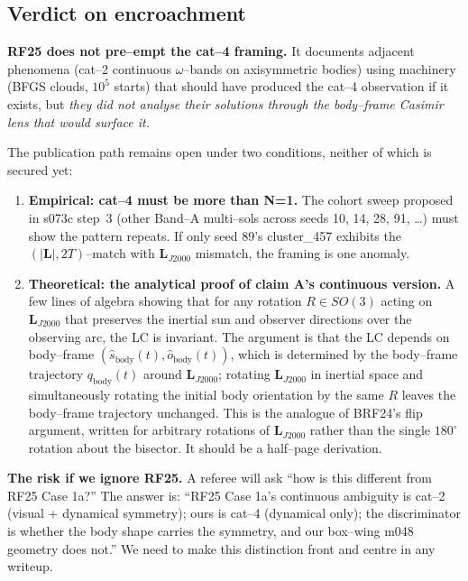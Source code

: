 \documentclass[11pt]{article}
\newcommand{\Lvec}{\mathbf{L}}
\newcommand{\LJ}{\Lvec_{J2000}}
\begin{document}
\subsection{Verdict on encroachment}

\noindent
\textbf{RF25 does not pre--empt the cat--4 framing.} It documents adjacent
phenomena (cat--2 continuous $\omega$--bands on axisymmetric bodies) using
machinery (BFGS clouds, $10^5$ starts) that should have produced the cat--4
observation if it exists, but \emph{they did not analyse their solutions
through the body--frame Casimir lens that would surface it.}

The publication path remains open under two conditions, neither of which is
secured yet:

\begin{enumerate}
\item \textbf{Empirical: cat--4 must be more than N=1.} The cohort sweep
proposed in s073c step~3 (other Band--A multi--sols across seeds 10, 14,
28, 91, \ldots) must show the pattern repeats. If only seed 89's
cluster\_457 exhibits the $(|\Lvec|, 2T)$--match with $\LJ$ mismatch,
the framing is one anomaly.

\item \textbf{Theoretical: the analytical proof of claim A's continuous
version.} A few lines of algebra showing that for any rotation $R \in
SO(3)$ acting on $\LJ$ that preserves the inertial sun and observer
directions over the observing arc, the LC is invariant. The argument is
that the LC depends on body--frame $(\hat{s}_{\mathrm{body}}(t),
\hat{o}_{\mathrm{body}}(t))$, which is determined by the body--frame
trajectory $q_{\mathrm{body}}(t)$ around $\LJ$; rotating $\LJ$ in
inertial space and simultaneously rotating the initial body orientation
by the same $R$ leaves the body--frame trajectory unchanged.
This is the analogue of BRF24's flip argument, written for arbitrary
rotations of $\LJ$ rather than the single $180^\circ$ rotation about
the bisector. It should be a half--page derivation.
\end{enumerate}

\noindent
\textbf{The risk if we ignore RF25.} A referee will ask ``how is this
different from RF25 Case 1a?'' The answer is: ``RF25 Case 1a's continuous
ambiguity is cat--2 (visual + dynamical symmetry); ours is cat--4 (dynamical
only); the discriminator is whether the body shape carries the symmetry,
and our box--wing m048 geometry does not.'' We need to make this distinction
front and centre in any writeup.
\end{document}
